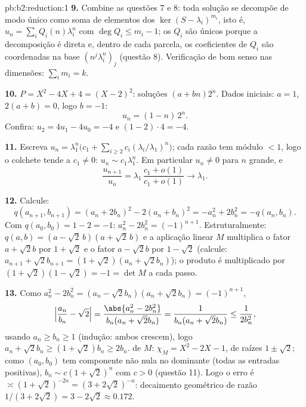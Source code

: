 \begin{solution}{pb:b2:reduction:1}
\textbf{9.} Combine as questões 7 e 8: toda solução se decompõe
de modo único como soma de elementos dos $\ker(S -
\lambda_i)^{m_i}$, isto é, $u_n = \sum_i Q_i(n)\lambda_i^n$ com
$\deg Q_i \leq m_i - 1$; os $Q_i$ são únicos porque a
decomposição é direta e, dentro de cada parcela, os
coeficientes de $Q_i$ são coordenadas na base
$(n^j\lambda_i^n)_j$ (questão 8). Verificação de bom senso nas dimensões:
$\sum_i m_i = k$.

\textbf{10.} $P = X^2 - 4X + 4 = (X - 2)^2$: soluções $(a +
bn)2^n$. Dados iniciais: $a = 1$, $2(a + b) = 0$, logo $b = -1$:
\[
u_n = (1 - n)\,2^n .
\]
Confira: $u_2 = 4u_1 - 4u_0 = -4$ e $(1 - 2)\cdot4 = -4$.

\textbf{11.} Escreva $u_n = \lambda_1^n\bigl(c_1 + \sum_{i\geq2}
c_i(\lambda_i/\lambda_1)^n\bigr)$; cada razão tem módulo $< 1$,
logo o colchete tende a $c_1 \neq 0$: $u_n \sim c_1\lambda_1^n$.
Em particular $u_n \neq 0$ para $n$ grande, e
\[
\frac{u_{n+1}}{u_n} =
\lambda_1\,\frac{c_1 + o(1)}{c_1 + o(1)} \longrightarrow
\lambda_1 .
\]

\textbf{12.} Calcule:
\[
q(a_{n+1}, b_{n+1}) = (a_n + 2b_n)^2 - 2(a_n + b_n)^2
= -a_n^2 + 2b_n^2 = -q(a_n, b_n).
\]
Com $q(a_0, b_0) = 1 - 2 = -1$: $a_n^2 - 2b_n^2 = (-1)^{n+1}$.
Estruturalmente: $q(a, b) = (a - \sqrt2\,b)(a + \sqrt2\,b)$ e
a aplicação linear $M$ multiplica o fator $a + \sqrt2 b$ por $1 +
\sqrt2$ e o fator $a - \sqrt2 b$ por $1 - \sqrt2$ (calcule:
$a_{n+1} + \sqrt2 b_{n+1} = (1 + \sqrt2)(a_n + \sqrt2 b_n)$);
o produto é multiplicado por $(1 + \sqrt2)(1 - \sqrt2) = -1 =
\det M$ a cada passo.

\textbf{13.} Como $a_n^2 - 2b_n^2 = (a_n - \sqrt2 b_n)(a_n +
\sqrt2 b_n) = (-1)^{n+1}$,
\[
\Bigl|\frac{a_n}{b_n} - \sqrt2\Bigr|
= \frac{\abs{a_n^2 - 2b_n^2}}{b_n(a_n + \sqrt2 b_n)}
= \frac{1}{b_n(a_n + \sqrt2 b_n)} \leq \frac1{2b_n^2},
\]
usando $a_n \geq b_n \geq 1$ (indução: ambos crescem), logo $a_n +
\sqrt2 b_n \geq (1 + \sqrt2)b_n \geq 2b_n$.  de $M$:
$\chi_M = X^2 - 2X - 1$, de raízes $1 \pm \sqrt2$; como $(a_0, b_0)$
tem componente não nula no  dominante (todas as entradas
positivas), $b_n \sim c(1 + \sqrt2)^n$ com $c > 0$ (questão
11). Logo o erro é $\asymp (1 + \sqrt2)^{-2n} = (3 +
2\sqrt2)^{-n}$: decaimento geométrico de razão $1/(3 + 2\sqrt2) = 3
- 2\sqrt2 \approx 0.172$.


\end{solution}
